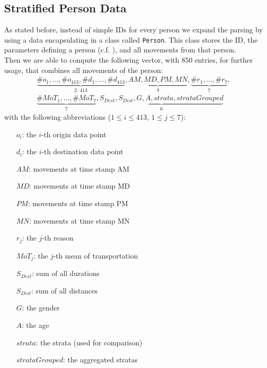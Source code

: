 \documentclass[runningheads]{llncs}
\begin{document}
	\subsection{Stratified Person Data}\label{subsec: person vector data}
	As stated before, instead of simple IDs for every person we expand the parsing by using a data encapsulating in a class called \texttt{Person}. This class stores the ID, the parameters defining a person (c.f. ), and all movements from that person.\\
	Then we are able to compute the following vector, with 850 entries, for further usage, that combines all movements of the person:
	\begin{align*}
	\underbrace{\#o_1, \dots, \#o_{413}, \#d_1, \dots, \#d_{413}}_{2\cdot 413} ,
	\underbrace{\mathit{AM}, \mathit{MD}, \mathit{PM}, \mathit{MN}}_{4}, 
	\underbrace{\#r_1, \dots, \#r_7}_{7}, \\
	\underbrace{\#\mathit{MoT}_1, \dots, \#\mathit{MoT}_7}_{7}, \underbrace{\mathit{S_{Dest}}, \mathit{S_{Dist}}, \mathit{G}, \mathit{A} ,\mathit{strata}, \mathit{strataGrouped}}_{6}
	\end{align*}
	with the following abbreviations ($1 \le i \le 413$, $1 \le j \le 7$):
	\begin{multicols}{2}
		\begin{itemize}
			\setlength{\itemindent}{.4cm}
			\item[$o_i$:]  the $i$-th origin data point
			\item[$d_i$:]  the $i$-th destination data point
			\item[$\mathit{AM}$:] movements at time stamp AM
			\item[$\mathit{MD}$:] movements at time stamp MD
			\item[$\mathit{PM}$:] movements at time stamp PM
			\item[$\mathit{MN}$:] movements at time stamp MN
			\item[$r_j$:] the $j$-th reason
			\item[$\mathit{MoT}_j$:] the $j$-th mean of transportation
			\item[$\mathit{S_{Dest}}$:] sum of all durations
			\item[$\mathit{S_{Dist}}$:] sum of all distances
			\item[$\mathit{G}$:] the gender
			\item[$\mathit{A}$:] the age
			\item[$strata$:] the strata (used for comparison)
			\item[$strataGrouped$:] the aggregated stratas
		\end{itemize}
	\end{multicols}
\end{document}

